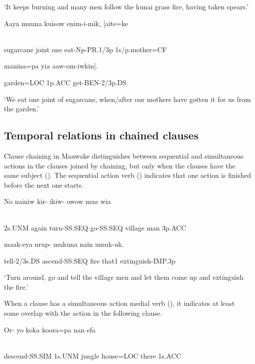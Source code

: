 `It keeps burning and many men follow the kunai grass fire, having taken spears.'

\ea%
\label{ex:x1470}
\gll Aaya  muuna  kuisow  enim-i-mik,  [aite=ke    \\
      \\
\glt
\z

sugarcane  joint  one  eat-Np-PR.1/3p  1s/p.mother=CF  

manina=pa  yia  aaw-om-iwkin].

garden=LOC  1p.ACC  get-BEN-2/3p.DS

`We eat one joint of sugarcane, when/after our mothers have gotten it for us from the garden.'

\subsection{Temporal relations in chained clauses}
\hypertarget{RefHeading23141935131865}{}
Clause chaining in Mauwake distinguishes between sequential and simultaneous actions in the clauses joined by chaining, but only when the clauses have the same subject (). The sequential action verb () indicates that one action is finished before the next one starts. 

\ea%
\label{ex:x1431}
\gll No  nainiw  kir-  ikiw-  owow  mua  wia  \\
      \\
\glt
\z

2s.UNM  again  turn-SS.SEQ  go-SS.SEQ  village  man  3p.ACC

maak-eya  urup-  mukuna  nain  umuk-uk.

tell-2/3s.DS  ascend-SS.SEQ  fire  that1  extinguish-IMP.3p

`Turn around, go and tell the village men and let them come up and extinguish the fire.'

When a clause has a simultaneous action medial verb (), it indicates at least some overlap with the action in the following clause. 

\ea%
\label{ex:x1432}
\gll Or-  yo  koka  koora=pa  nan  efa  \\
      \\
\glt
\z

descend-SS.SIM  1s.UNM  jungle  house=LOC  there  1s.ACC

